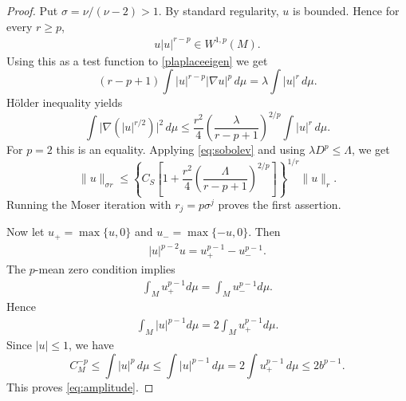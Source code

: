 \documentclass[11pt]{amsart}
\theoremstyle{definition}
\begin{document}
\begin{proof}
Put $\sigma=\nu/(\nu-2)>1$. By standard regularity, $u$ is bounded. Hence for every $r\geq p$, 
\begin{align*}
    u|u|^{r-p}\in W^{1,p}(M).
\end{align*}
Using this as a test function to \eqref{plaplaceeigen} we get
\[
 (r-p+1)\int |u|^{r-p}|\nabla u|^p\,d\mu
             =\lambda\int |u|^r\,d\mu.
\]
H\"older inequality yields
\[
 \int\bigl|\nabla(|u|^{r/2})\bigr|^2\,d\mu
 \le\frac{r^2}{4}
       \left(\frac{\lambda}{r-p+1}\right)^{2/p}
       \int |u|^r\,d\mu.
\]
For $p=2$ this is an equality. Applying
\eqref{eq:sobolev} and using $\lambda D^p\leq \Lambda$, we get
\begin{equation}\label{eq:moser}
 \|u\|_{\sigma r}\le
 \left\{C_S\left[1+\frac{r^2}{4}
  \left(\frac{\Lambda}{r-p+1}\right)^{2/p}\right]\right\}^{1/r}
 \|u\|_r.
\end{equation}
Running the Moser iteration with $r_j=p\sigma^j$ proves the first assertion.

Now let $u_+=\max\{u,0\}$ and $u_-=\max\{-u,0\}$.  Then
\begin{align*}
    |u|^{p-2}u=u_+^{p-1}-u_-^{p-1}.
\end{align*}
The $p$-mean zero condition implies
\begin{align*}
    \int_Mu_+^{p-1}d\mu=\int_Mu_-^{p-1}d\mu.
\end{align*}
Hence
\begin{align*}
\int_M |u|^{p-1}d\mu=2\int_Mu_+^{p-1}d\mu.
\end{align*}
Since $|u|\leq 1$, we have
\[
 C_M^{-p}\le\int|u|^p\,d\mu
 \le\int|u|^{p-1}\,d\mu
 =2\int u_+^{p-1}\,d\mu\le2b^{p-1}.
\]
This proves \eqref{eq:amplitude}.
\end{proof}
\end{document}
